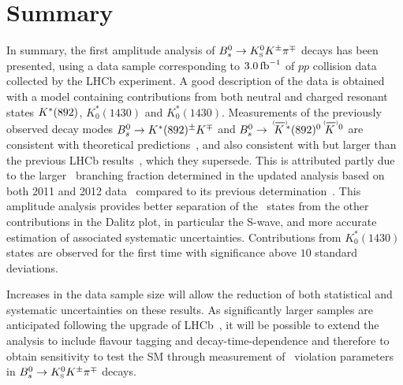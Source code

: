 \section{Summary}
\label{sec:summary}

In summary, the first amplitude analysis of ${{B}^0_{s}} \rightarrow {\ensuremath{{K}^0_{\mathrm{ \scriptscriptstyle S}}}}{\ensuremath{{K}^\pm}}{\ensuremath{{\pi}^\mp}}$ decays has been presented, using a data sample corresponding to $3.0\mbox{\,fb}^{-1}$ of $pp$ collision data collected 
by the LHCb experiment. 
A good description of the data is obtained with a model containing contributions 
from both neutral and charged resonant states ${{K}^*}(892)$, $K^*_0(1430)$ and $K^*_0(1430)$. 
Measurements of the previously observed decay modes
${{B}^0_{s}}\rightarrow{\ensuremath{{K}^*}}(892)^{\pm}{{K}^\mp}$ and $\Bs\to\KstarIzoptbar\KorKbarz$ are consistent with theoretical predictions~\cite{Cheng:2014uga,Li:2014fla,Li:2018qrm}, and also consistent with but larger than the previous LHCb results~\cite{LHCb-PAPER-2014-043,LHCb-PAPER-2015-018}, which they supersede.
This is attributed partly due to the larger \BstoKsKPi\ branching fraction determined in the updated analysis based on both 2011 and 2012 data~\cite{LHCb-PAPER-2017-010} compared to its previous determination~\cite{LHCb-PAPER-2013-042}. 
This amplitude analysis provides better separation of the \KstarI\ states from the other contributions in the Dalitz plot, in particular the S-wave, and more accurate estimation of associated systematic uncertainties.
Contributions from $K^*_0(1430)$ states are observed for the first time with significance above $10$ standard deviations. 

Increases in the data sample size will allow the reduction of both statistical and systematic uncertainties on these results.
As significantly larger samples are anticipated following the upgrade of LHCb~\cite{LHCb-TDR-012,LHCb-PII-EoI}, it will be possible to extend the analysis to include flavour tagging and decay-time-dependence and therefore to obtain sensitivity to test the SM through measurement of \CP\ violation parameters in ${{B}^0_{s}} \rightarrow {\ensuremath{{K}^0_{\mathrm{ \scriptscriptstyle S}}}}{\ensuremath{{K}^\pm}}{\ensuremath{{\pi}^\mp}}$ decays.



